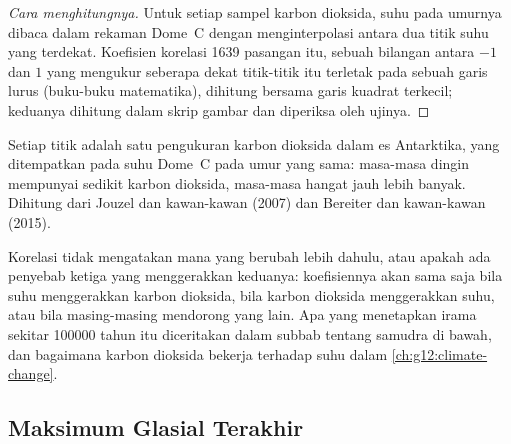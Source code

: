 \begin{proof}[Cara menghitungnya]
Untuk setiap sampel karbon dioksida, suhu pada umurnya dibaca dalam rekaman
Dome~C dengan menginterpolasi antara dua titik suhu yang terdekat. Koefisien
korelasi 1639 pasangan itu, sebuah bilangan antara $-1$ dan $1$ yang mengukur
seberapa dekat titik-titik itu terletak pada sebuah garis lurus (buku-buku
matematika), dihitung bersama garis kuadrat terkecil; keduanya dihitung dalam
skrip gambar dan diperiksa oleh ujinya.
\end{proof}

\begin{omfigure}

{\small Setiap titik adalah satu pengukuran karbon dioksida dalam es Antarktika,
yang ditempatkan pada suhu Dome~C pada umur yang sama: masa-masa dingin
mempunyai sedikit karbon dioksida, masa-masa hangat jauh lebih banyak. Dihitung
dari Jouzel dan kawan-kawan (2007) dan Bereiter dan kawan-kawan (2015).}
\end{omfigure}

Korelasi tidak mengatakan mana yang berubah lebih dahulu, atau apakah ada
penyebab ketiga yang menggerakkan keduanya: koefisiennya akan sama saja bila
suhu menggerakkan karbon dioksida, bila karbon dioksida menggerakkan suhu, atau
bila masing-masing mendorong yang lain. Apa yang menetapkan irama sekitar
\num{100000} tahun itu diceritakan dalam subbab tentang samudra di bawah, dan
bagaimana karbon dioksida bekerja terhadap suhu dalam
\cref{ch:g12:climate-change}.

\subsection{Maksimum Glasial Terakhir}

